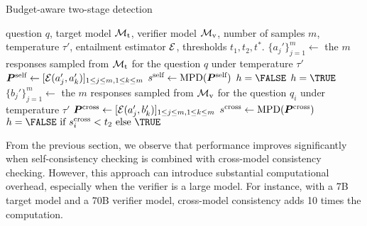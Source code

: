 \begin{algorithm}[!t]
   \caption{Budget-aware two-stage detection}
   \label{alg: two_stage}
   \small
\begin{algorithmic}
    question $q$, target model ${\mathcal{M}}_{\text{t}}$, verifier model ${\mathcal{M}}_{\text{v}}$, number of samples $m$, temperature $\tau'$, entailment estimator ${\mathcal{E}}$, %
   thresholds $t_1, t_2, t^\ast$.
   \STATE $\{a_{j}'\}_{j=1}^{m} \leftarrow$ the $m$ responses sampled from ${\mathcal{M}}_{\text{t}}$ for the question $q$ under temperature $\tau'$ 
   \STATE ${\bm{P}}^{\text{self}} \leftarrow [{\mathcal{E}}( a_{j}', a_{k}')]_{1\leq j\leq m, 1\leq k \leq m }$ 
   \STATE $s^{\text{self}}\leftarrow \text{MPD}({\bm{P}}^{\text{self}}) $
   \RETURN $h = \FALSE$ 
   \RETURN $h = \TRUE$  
   \ELSE %
   \STATE $\{b_{j}'\}_{j=1}^{m} \leftarrow$ the $m$ responses sampled from ${\mathcal{M}}_{\text{v}}$ for the question $q_i$ under temperature $\tau'$ 
   \STATE ${\bm{P}}^{\text{cross}} \leftarrow [{\mathcal{E}}( a_{j}', b_{k}')]_{1\leq j\leq m, 1\leq k \leq m }$ 
   \STATE $s^{\text{cross}} \leftarrow \text{MPD}({\bm{P}}^{\text{cross}}) $
   \RETURN $h = \FALSE~ \text{if}~ \scross_i< t_2 ~\text{else}~ \TRUE $
    
   \ENDIF
\end{algorithmic}
\end{algorithm}


From the previous section, we observe that performance improves significantly when self-consistency checking is combined with cross-model consistency checking. However, this approach can introduce substantial computational overhead, especially when the verifier is a large model. For instance, with a 7B target model and a 70B verifier model, cross-model consistency adds 10 times the computation.

